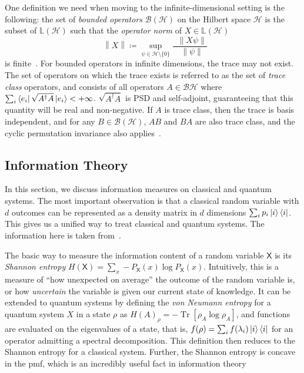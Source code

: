 \documentclass[10pt, a4paper]{article}
\numberwithin{equation}{section} %
\theoremstyle{definition}
\theoremstyle{plain}
\newcommand{\norm}[1]{\mathop{}\left\lVert#1\right\rVert}
\newcommand{\?}{\mathrel{?}} %
\newcommand{\Lin}[1]{\mathbb{L}\left(#1\right)}
\newcommand{\Tr}[2][]{\mathop{\mathrm{Tr}#1}\left[ #2 \right]} %
\newcommand{\Hs}{\mathcal{H}} %
\newcommand{\crv}[1]{\mathsf{#1}}
\begin{document}
\begin{appendices}
                  One definition we need when moving to the infinite-dimensional setting is the following: the set of \emph{bounded operators} \(\mathcal{B}(\Hs)\) on the Hilbert space \(\Hs\) is the subset of \(\Lin{\Hs}\) such that the \emph{operator norm} of \(X \in \Lin{\Hs}\)
    \begin{equation}
    \norm{X} \coloneqq \sup_{\psi \in \Hs \setminus \{0\}} \frac{\norm{X\psi}}{\norm{\psi}}
  \end{equation}
  is finite~\cite{HallQuantumForMath}. For bounded operators in infinite dimensions, the trace may not exist. The set of operators on which the trace exists is referred to as the set of \emph{trace class} operators, and consists of all operators \(A \in \mathcal{B}{\Hs}\) where \(\sum_i \bra{e_i}\sqrt{A^{\dagger}A}\ket{e_i} < +\infty\). \(\sqrt{A^{\dagger}A}\) is PSD and self-adjoint, guaranteeing that this quantity will be real and non-negative. If \(A\) is trace class, then the trace is basis independent, and for any \(B \in \mathcal{B}(\Hs)\), \(AB\) and \(BA\) are also trace class, and the cyclic permutation invariance also applies~\cite[Sec. 19.2]{HallQuantumForMath}.

                    \subsection{Information Theory}\label{sec:prelim_infot}

                    In this section, we discuss information measures on classical and quantum systems. The most important observation is that a classical random variable with \(d\) outcomes can be represented as a density matrix in \(d\) dimensions \(\sum_i p_i \ket{i}\bra{i}\). This gives us a unified way to treat classical and quantum systems. The information here is taken from~\cite{NielsenChuang,ElemInfo}.

                    The basic way to measure the information content of a random variable \(\crv{X}\) is its \emph{Shannon entropy} \(H(\crv{X}) = \sum_{x} - P_{\crv{X}}(x) \log P_{\crv{X}}(x)\). Intuitively, this is a measure of ``how unexpected on average'' the outcome of the random variable is, or how \emph{uncertain} the variable is given our current state of knowledge. It can be extended to quantum systems by defining the \emph{von Neumann entropy} for a quantum system \(X\) in a state \(\rho\) as \({H(A)}_{\rho} = -\Tr{\rho_{A}\log\rho_{A}}\), and functions are evaluated on the eigenvalues of a state, that is, \(f(\rho) = \sum_i f(\lambda_i) \ket{i}\bra{i}\) for an operator admitting a spectral decomposition. This definition then reduces to the Shannon entropy for a classical system. Further, the Shannon entropy is concave in the pmf, which is an incredibly useful fact in information theory


\end{appendices}
\end{document}
